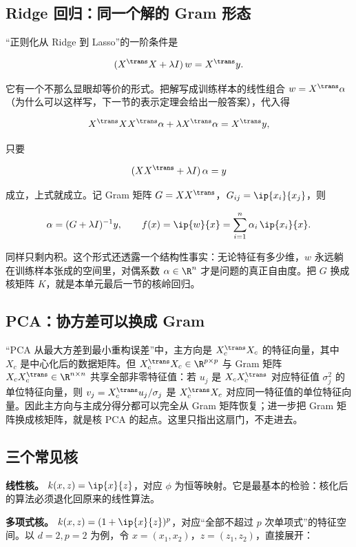 \subsection{Ridge 回归：同一个解的 Gram 形态}

``正则化从 Ridge 到 Lasso''的一阶条件是

\[
(X^{\trans}X+\lambda I)\,w=X^{\trans}y.
\]

它有一个不那么显眼却等价的形式。把解写成训练样本的线性组合 \(w=X^{\trans}\alpha\)（为什么可以这样写，下一节的表示定理会给出一般答案），代入得

\[
X^{\trans}XX^{\trans}\alpha+\lambda X^{\trans}\alpha=X^{\trans}y,
\]

只要

\[
(XX^{\trans}+\lambda I)\,\alpha=y
\]

成立，上式就成立。记 Gram 矩阵 \(G=XX^{\trans}\)，\(G_{ij}=\ip{x_i}{x_j}\)，则

\[
\alpha=(G+\lambda I)^{-1}y,
\qquad
f(x)=\ip{w}{x}=\sum_{i=1}^{n}\alpha_i\,\ip{x_i}{x}.
\]

同样只剩内积。这个形式还透露一个结构性事实：无论特征有多少维，\(w\) 永远躺在训练样本张成的空间里，对偶系数 \(\alpha\in\R^n\) 才是问题的真正自由度。把 \(G\) 换成核矩阵 \(K\)，就是本单元最后一节的核岭回归。

\subsection{PCA：协方差可以换成 Gram}

``PCA 从最大方差到最小重构误差''中，主方向是 \(X_c^{\trans}X_c\) 的特征向量，其中 \(X_c\) 是中心化后的数据矩阵。但 \(X_c^{\trans}X_c\in\R^{p\times p}\) 与 Gram 矩阵 \(X_cX_c^{\trans}\in\R^{n\times n}\) 共享全部非零特征值：若 \(u_j\) 是 \(X_cX_c^{\trans}\) 对应特征值 \(\sigma_j^2\) 的单位特征向量，则 \(v_j=X_c^{\trans}u_j/\sigma_j\) 是 \(X_c^{\trans}X_c\) 对应同一特征值的单位特征向量。因此主方向与主成分得分都可以完全从 Gram 矩阵恢复；进一步把 Gram 矩阵换成核矩阵，就是核 PCA 的起点。这里只指出这扇门，不走进去。

\subsection{三个常见核}

\textbf{线性核。} \(k(x,z)=\ip{x}{z}\)，对应 \(\phi\) 为恒等映射。它是最基本的检验：核化后的算法必须退化回原来的线性算法。

\textbf{多项式核。} \(k(x,z)=(1+\ip{x}{z})^{p}\)，对应``全部不超过 \(p\) 次单项式''的特征空间。以 \(d=2,p=2\) 为例，令 \(x=(x_1,x_2)\)，\(z=(z_1,z_2)\)，直接展开：

